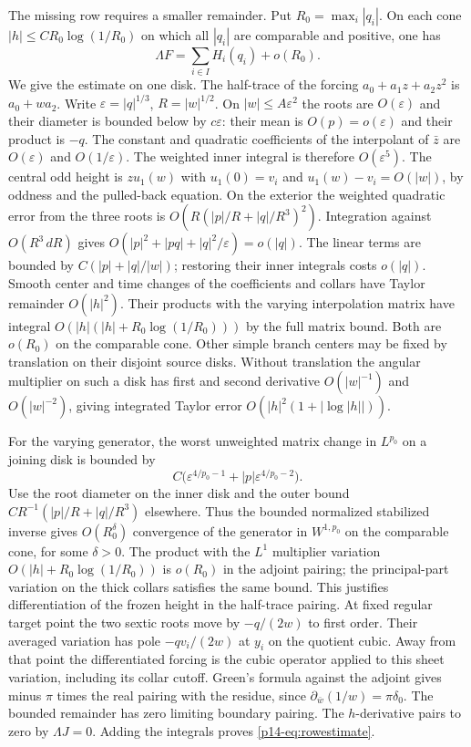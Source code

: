 The missing row requires a smaller remainder. Put
$R_0=\max_i|q_i|$. On each cone $|h|\le C R_0\log(1/R_0)$ on
which all $|q_i|$ are comparable and positive, one has
\begin{equation}\label{p14-eq:rowestimate}
                       \Lambda F=\sum_{i\in I} H_i(q_i)+o(R_0).
\end{equation}
We give the estimate on one disk. The half-trace of the forcing
$a_0+a_1z+a_2z^2$ is $a_0+w a_2$. Write $\varepsilon=|q|^{1/3}$,
$R=|w|^{1/2}$. On $|w|\le A\varepsilon^2$ the roots are
$O(\varepsilon)$ and their diameter is bounded below by
$c\varepsilon$: their mean is $O(p)=o(\varepsilon)$ and their
product is $-q$. The constant and quadratic coefficients of the
interpolant of $\bar z$ are $O(\varepsilon)$ and $O(1/\varepsilon)$.
The weighted inner integral is therefore $O(\varepsilon^5)$.
The central odd height is $z u_1(w)$ with $u_1(0)=v_i$ and
$u_1(w)-v_i=O(|w|)$, by oddness and the pulled-back equation.
On the exterior the weighted quadratic error from the three roots is
$O(R(|p|/R+|q|/R^3)^2)$. Integration against $O(R^3\,dR)$ gives
$O(|p|^2+|pq|+|q|^2/\varepsilon)=o(|q|)$. The linear terms are bounded
by $C(|p|+|q|/|w|)$; restoring their inner integrals costs $o(|q|)$.
Smooth center and time changes of the coefficients and collars have
Taylor remainder \(O(|h|^2)\). Their products with the varying
interpolation matrix have integral \(O(|h|(|h|+R_0\log(1/R_0)))\)
by the full matrix bound. Both are \(o(R_0)\) on the comparable cone. Other simple branch centers may be fixed by
translation on their disjoint source disks. Without translation the
angular multiplier on such a disk has first and second derivative
$O(|w|^{-1})$ and $O(|w|^{-2})$, giving integrated Taylor error
$O(|h|^2(1+|\log|h||))$.

For the varying generator, the worst unweighted matrix change in
$L^{p_0}$ on a joining disk is bounded by
\[
 C\big(\varepsilon^{4/p_0-1}
       +|p|\varepsilon^{4/p_0-2}\big).
\]
Use the root diameter on the inner disk and the outer bound
$CR^{-1}(|p|/R+|q|/R^3)$ elsewhere. Thus the bounded normalized
stabilized inverse gives $O(R_0^\delta)$ convergence of the generator
in $W^{1,p_0}$ on the comparable cone, for some $\delta>0$.
The product with the $L^1$ multiplier variation
$O(|h|+R_0\log(1/R_0))$ is $o(R_0)$ in the adjoint pairing; the
principal-part variation on the thick collars satisfies the same
bound. This justifies differentiation of the frozen height in
the half-trace pairing. At fixed regular target point the two
sextic roots move by $-q/(2w)$ to first order. Their averaged
variation has pole $-qv_i/(2w)$ at $y_i$ on the quotient cubic.
Away from that point the differentiated forcing is the cubic
operator applied to this sheet variation, including its collar cutoff.
Green's formula against the adjoint gives minus $\pi$ times
the real pairing with the residue, since
$\partial_{\bar w}(1/w)=\pi\delta_0$. The bounded remainder has
zero limiting boundary pairing. The $h$-derivative pairs to zero
by $\Lambda J=0$. Adding the integrals proves \eqref{p14-eq:rowestimate}.

